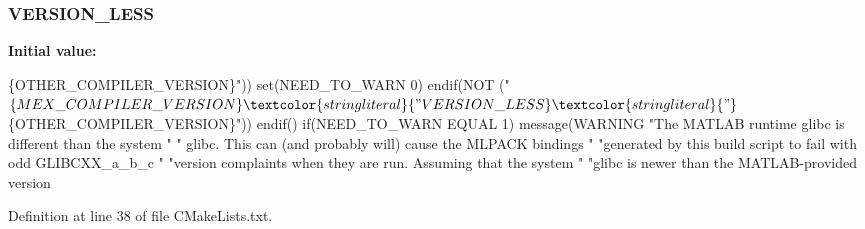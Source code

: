 \subsubsection[{V\+E\+R\+S\+I\+O\+N\+\_\+\+L\+E\+SS}]{\setlength{\rightskip}{0pt plus 5cm}V\+E\+R\+S\+I\+O\+N\+\_\+\+L\+E\+SS}\label{bindings_2matlab_2CMakeLists_8txt_ae9400086b3e97b5a80e1ae47fe7731d2}
{\bfseries Initial value\+:}
\begin{DoxyCode}
\{OTHER\_COMPILER\_VERSION\}\textcolor{stringliteral}{"))}
\textcolor{stringliteral}{}
\textcolor{stringliteral}{}
\textcolor{stringliteral}{        set(NEED\_TO\_WARN 0)}
\textcolor{stringliteral}{      endif(NOT ("}$\{MEX\_COMPILER\_VERSION\}\textcolor{stringliteral}{" VERSION\_LESS}
\textcolor{stringliteral}{          "}$\{OTHER\_COMPILER\_VERSION\}\textcolor{stringliteral}{"))}
\textcolor{stringliteral}{    endif()}
\textcolor{stringliteral}{}
\textcolor{stringliteral}{    if(NEED\_TO\_WARN EQUAL 1)}
\textcolor{stringliteral}{      message(WARNING "}The MATLAB runtime glibc is different than the system \textcolor{stringliteral}{"}
\textcolor{stringliteral}{          "} glibc.  This can (and probably will) cause the MLPACK bindings \textcolor{stringliteral}{"}
\textcolor{stringliteral}{          "}generated by \textcolor{keyword}{this} build script to fail with odd GLIBCXX\_a\_b\_c \textcolor{stringliteral}{"}
\textcolor{stringliteral}{          "}version complaints when they are run.  Assuming that the system \textcolor{stringliteral}{"}
\textcolor{stringliteral}{          "}glibc is newer than the MATLAB-provided version
\end{DoxyCode}


Definition at line 38 of file C\+Make\+Lists.\+txt.

